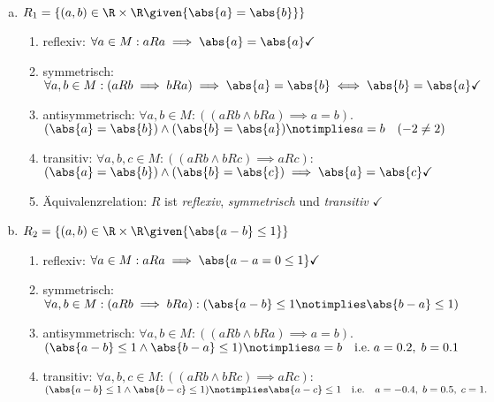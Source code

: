   \begin{enumerate}[a)]
  \item $ R_1 = \{(a,b) \in \R \times \R \given{\abs{a} = \abs{b}}  \}  $
    \begin{enumerate}
      \item reflexiv: $\forall a \in M: aRa \implies \abs{a} = \abs{a} \checkmark$
      \item symmetrisch: $ \forall a, b \in M: (aRb \implies bRa) \implies \abs{a} =
       \abs{b} \iff \abs{b} = \abs{a} \checkmark  $

      \item antisymmetrisch: $ \forall a,b \in M : ((aRb \land bRa) \implies a = b).  $\\
      $ (\abs{a} = \abs{b}) \land (\abs{b} = \abs{a}) \notimplies a = b \hspace{1em} (-2 \neq 2)$

      \item transitiv: $ \forall a,b,c \in M: ((aRb \land bRc) \implies aRc)  $:\\
      $ (\abs{a}=\abs{b}) \land (\abs{b} = \abs{c}) \implies \abs{a} = \abs{c} \checkmark  $

      \item Äquivalenzrelation: $R$ ist \emph{reflexiv}, \emph{symmetrisch} und \emph{transitiv} $\checkmark$
    \end{enumerate}

\newpage

  \item $ R_2 = \{(a,b) \in \R \times \R \given{\abs{a-b}\leq 1} \}  $

    \begin{enumerate}
      \item reflexiv: $\forall a \in M: aRa \implies
      \abs{a-a = 0 \le 1} \checkmark$
      \item symmetrisch: $ \forall a, b \in M: (aRb \implies bRa):
      (\abs{a-b} \leq 1 \notimplies \abs{b-a} \le 1)  $

      \item antisymmetrisch: $ \forall a,b \in M : ((aRb \land bRa) \implies a = b). $\\
      $ (\abs{a-b} \leq 1 \land
      \abs{b-a} \le 1) \notimplies a=b
      \hspace{1em} \text{i.e.}
       \; a = 0.2,\; b = 0.1 $

      \item transitiv: $ \forall a,b,c \in M: ((aRb \land bRc) \implies aRc)  $:\\
      $ (\abs{a-b} \leq 1 \land \abs{b-c} \le 1) \notimplies \abs{a-c} \le 1 \hspace{1em}
       \text{i.e.} \hspace{1em} a = -0.4,\; b = 0.5, \; c = 1.$


\end{enumerate}
\end{enumerate}
